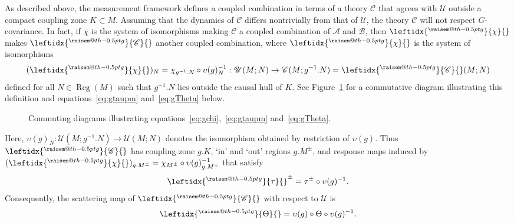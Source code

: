 \documentclass[sn-mathphys-num]{sn-jnl}%
\makeatletter
\newcommand{\raisemath}[1]{\mathpalette{\raisem@th{#1}}}
\newcommand{\raisem@th}[3]{\raisebox{#1}{$#2#3$}}
\newcommand{\act}[2]{\leftidx{^{\raisemath{-0.5pt}{#1}}}{#2}{}}
\newcommand{\Af}{\mathscr{A}}
\newcommand{\Bf}{\mathscr{B}}
\newcommand{\Cf}{\mathscr{C}}
\newcommand{\Uf}{\mathscr{U}}
\DeclareMathOperator{\Reg}{Reg}
\numberwithin{equation}{section}
\theoremstyle{thmstyleone}%
\theoremstyle{thmstyletwo}%
\theoremstyle{thmstylethree}%
\makeatother
\begin{document}
As described above, the measurement framework defines a coupled combination 
in terms of a theory $\Cf$ that agrees with $\Uf$ outside a compact coupling zone $K\subset M$.
Assuming that the dynamics of $\Cf$ differs nontrivially from that of $\Uf$, the theory $\Cf$ 
will not respect $G$-covariance. In fact, if $\chi$ is the system of isomorphisms making $\Cf$
a coupled combination of $\Af$ and $\Bf$, then $\act{g}{\chi}$ makes $\act{g}{\Cf}$ another coupled combination, where $\act{g}{\chi}$ is the system of isomorphisms
\begin{equation}\label{eq:gchi}
    (\act{g}{\chi})_N = \chi_{g^{-1}.N} \circ \upsilon(g)_N^{-1}  : \Uf(M;N)\to \Cf(M;g^{-1}.N)=\act{g}{\Cf}(M;N)
\end{equation}
defined for all $N\in\Reg(M)$ such that $g^{-1}.N$ lies outside the causal hull of $K$. See Figure~\ref{fig:cd1} for a commutative diagram illustrating this definition and equations~\eqref{eq:gtaupm} and~\eqref{eq:gTheta} below.
\begin{figure}
    \centering 
    \hfil
    \caption{Commuting diagrams illustrating equations~\eqref{eq:gchi},~\eqref{eq:gtaupm} and~\eqref{eq:gTheta}.}
    \label{fig:cd1}
\end{figure}
Here, $\upsilon(g)_N:\Uf(M;g^{-1}.N)\to \Uf(M;N)$ denotes the isomorphism obtained by restriction of $\upsilon(g)$. Thus $\act{g}{\Cf}$ has coupling zone $g.K$, 
`in' and `out' regions $g.M^\pm$, and response maps induced by 
$(\act{g}{\chi})_{g.M^\pm}=\chi_{M^\pm}\circ \upsilon(g)^{-1}_{g.M^\pm}$  that satisfy
\begin{equation}\label{eq:gtaupm}
    \act{g}{\tau}^\pm = \tau^\pm \circ \upsilon(g)^{-1}. 
\end{equation}
Consequently, the scattering map of $\act{g}{\Cf}$ with respect to $\Uf$ is
\begin{equation}\label{eq:gTheta}
    \act{g}{\Theta} = \upsilon(g)\circ \Theta\circ \upsilon(g)^{-1}.
\end{equation}
\end{document}
